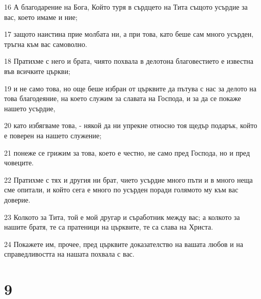 \par 16 А благодарение на Бога, Който туря в сърдцето на Тита същото усърдие за вас, което имаме и ние;
\par 17 защото наистина прие молбата ни, а при това, като беше сам много усърден, тръгна към вас самоволно.
\par 18 Пратихме с него и брата, чиято похвала в делотона благовестието е известна във всичките църкви;
\par 19 и не само това, но още беше избран от църквите да пътува с нас за делото на това благодеяние, на което служим за славата на Господа, и за да се покаже нашето усърдие,
\par 20 като избягваме това, - някой да ни упрекне относно тоя щедър подарък, който е поверен на нашето служение;
\par 21 понеже се грижим за това, което е честно, не само пред Господа, но и пред човеците.
\par 22 Пратихме с тях и другия ни брат, чието усърдие много пъти и в много неща сме опитали, и който сега е много по усърден поради голямото му към вас доверие.
\par 23 Колкото за Тита, той е мой другар и съработник между вас; а колкото за нашите братя, те са пратеници на църквите, те са слава на Христа.
\par 24 Покажете им, прочее, пред църквите доказателство на вашата любов и на справедливостта на нашата похвала с вас.

\chapter{9}

